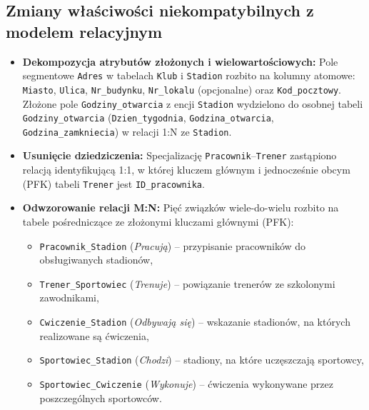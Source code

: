 \documentclass[11pt,a4paper]{article}
\begin{document}
\subsection{Zmiany właściwości niekompatybilnych z modelem relacyjnym}
\begin{itemize}
    \item \textbf{Dekompozycja atrybutów złożonych i wielowartościowych:} Pole segmentowe \texttt{Adres} w tabelach \texttt{Klub} i \texttt{Stadion} rozbito na kolumny atomowe: \texttt{Miasto}, \texttt{Ulica}, \texttt{Nr\_budynku}, \texttt{Nr\_lokalu} (opcjonalne) oraz \texttt{Kod\_pocztowy}. Złożone pole \texttt{Godziny\_otwarcia} z encji \texttt{Stadion} wydzielono do osobnej tabeli \texttt{Godziny\_otwarcia} (\texttt{Dzien\_tygodnia}, \texttt{Godzina\_otwarcia}, \texttt{Godzina\_zamkniecia}) w relacji 1:N ze \texttt{Stadion}.
    \item \textbf{Usunięcie dziedziczenia:} Specjalizację \texttt{Pracownik}--\texttt{Trener} zastąpiono relacją identyfikującą 1:1, w której kluczem głównym i jednocześnie obcym (PFK) tabeli \texttt{Trener} jest \texttt{ID\_pracownika}.
    \item \textbf{Odwzorowanie relacji M:N:} Pięć związków wiele-do-wielu rozbito na tabele pośredniczące ze złożonymi kluczami głównymi (PFK):
    \begin{itemize}
        \item \texttt{Pracownik\_Stadion} (\emph{Pracują}) -- przypisanie pracowników do obsługiwanych stadionów,
        \item \texttt{Trener\_Sportowiec} (\emph{Trenuje}) -- powiązanie trenerów ze szkolonymi zawodnikami,
        \item \texttt{Cwiczenie\_Stadion} (\emph{Odbywają się}) -- wskazanie stadionów, na których realizowane są ćwiczenia,
        \item \texttt{Sportowiec\_Stadion} (\emph{Chodzi}) -- stadiony, na które uczęszczają sportowcy,
        \item \texttt{Sportowiec\_Cwiczenie} (\emph{Wykonuje}) -- ćwiczenia wykonywane przez poszczególnych sportowców.
    \end{itemize}
\end{itemize}
\end{document}
